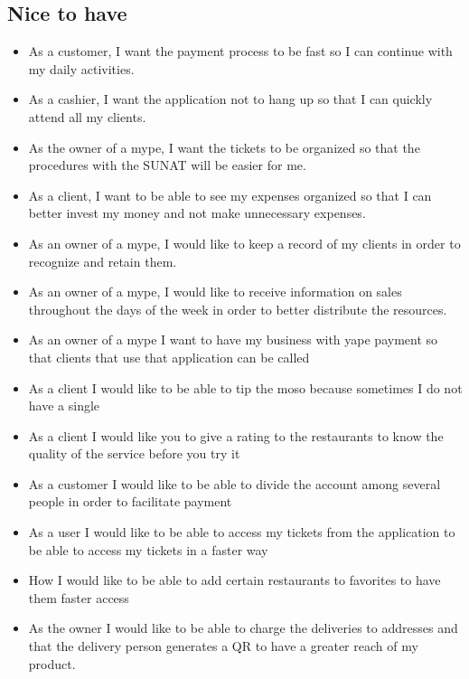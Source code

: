 \documentclass{article}
\begin{document}
\subsection{Nice to have}
\begin{itemize}
\item As a customer, I want the payment process to be fast so I can continue with my daily activities.
\item As a cashier, I want the application not to hang up so that I can quickly attend all my clients.
\item As the owner of a mype, I want the tickets to be organized so that the procedures with the SUNAT will be easier for me.
\item As a client, I want to be able to see my expenses organized so that I can better invest my money and not make unnecessary expenses.
\item As an owner of a mype, I would like to keep a record of my clients in order to recognize and retain them.
\item As an owner of a mype, I would like to receive information on sales throughout the days of the week in order to better distribute the resources.
\item As an owner of a mype I want to have my business with yape payment so that clients that use that application can be called
\item As a client I would like to be able to tip the moso because sometimes I do not have a single
\item As a client I would like you to give a rating to the restaurants to know the quality of the service before you try it
\item As a customer I would like to be able to divide the account among several people in order to facilitate payment
\item As a user I would like to be able to access my tickets from the application to be able to access my tickets in a faster way
\item How I would like to be able to add certain restaurants to favorites to have them faster access
\item As the owner I would like to be able to charge the deliveries to addresses and that the delivery person generates a QR to have a greater reach of my product.





\end{itemize}
\end{document}
